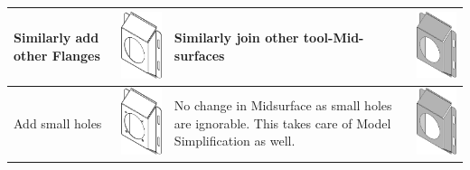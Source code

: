 \begin{longtable}{ L{0.18\textwidth} C{0.18\textwidth} L{0.38\textwidth}  C{0.18\textwidth}}
Similarly add other Flanges  &
\includegraphics[scale=0.23]{..//Common/images//DryRun7.png} &
Similarly join other tool-Mid-surfaces &
\includegraphics[scale=0.23]{..//Common/images//DryRun71.png} \\
\hline
Add small holes &
\includegraphics[scale=0.23]{..//Common/images//DryRun8.png} &
No change in Midsurface as small holes are ignorable. This takes care of Model Simplification as well. &
\includegraphics[scale=0.23]{..//Common/images//DryRun81.png} \\

\end{longtable}
